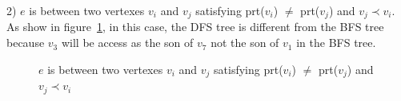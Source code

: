 2) $e$ is between two vertexes $v_i$ and $v_j$ satisfying prt($v_i$) $\neq$ prt($v_j$) and $v_j\prec v_i$. As show in figure~\ref{figure_3_4}, in this case, the DFS tree is different from the BFS tree because $v_3$ will be access as the son of $v_7$ not the son of $v_1$ in the BFS tree.
\begin{figure}[!htbp]
\centering
{}
\caption{$e$ is between two vertexes $v_i$ and $v_j$ satisfying prt($v_i$) $\neq$ prt($v_j$) and $v_j\prec v_i$}\label{figure_3_4}
\end{figure}

